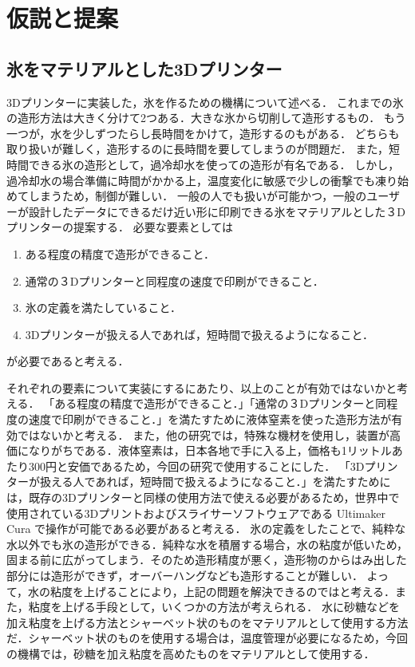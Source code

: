 \chapter{仮説と提案}
\label{chp:first}

\section{氷をマテリアルとした3Dプリンター}
\label{sec:paragraph2}

3Dプリンターに実装した，氷を作るための機構について述べる．
これまでの氷の造形方法は大きく分けて2つある．大きな氷から切削して造形するもの．
もう一つが，水を少しずつたらし長時間をかけて，造形するのもがある．
どちらも取り扱いが難しく，造形するのに長時間を要してしまうのが問題だ．
また，短時間できる氷の造形として，過冷却水を使っての造形が有名である．
しかし，過冷却水の場合準備に時間がかかる上，温度変化に敏感で少しの衝撃でも凍り始めてしまうため，制御が難しい．
一般の人でも扱いが可能かつ，一般のユーザーが設計したデータにできるだけ近い形に印刷できる氷をマテリアルとした３Dプリンターの提案する．
必要な要素としては

\begin{enumerate}
  \item ある程度の精度で造形ができること． 
  \item 通常の３Dプリンターと同程度の速度で印刷ができること．
  \item 氷の定義を満たしていること．
  \item 3Dプリンターが扱える人であれば，短時間で扱えるようになること．
 \end{enumerate}

が必要であると考える．

それぞれの要素について実装にするにあたり、以上のことが有効ではないかと考える．
「ある程度の精度で造形ができること．」「通常の３Dプリンターと同程度の速度で印刷ができること．」を満たすために液体窒素を使った造形方法が有効ではないかと考える．
また，他の研究では，特殊な機材を使用し，装置が高価になりがちである．液体窒素は，日本各地で手に入る上，価格も1リットルあたり300円と安価であるため，今回の研究で使用することにした．
「3Dプリンターが扱える人であれば，短時間で扱えるようになること．」を満たすためには，既存の3Dプリンターと同様の使用方法で使える必要があるため，世界中で使用されている3Dプリントおよびスライサーソフトウェアである Ultimaker Cura で操作が可能である必要があると考える．
氷の定義をしたことで、純粋な水以外でも氷の造形ができる．純粋な水を積層する場合，水の粘度が低いため，固まる前に広がってしまう．そのため造形精度が悪く，造形物のからはみ出した部分には造形ができず，オーバーハングなども造形することが難しい．
よって，水の粘度を上げることにより，上記の問題を解決できるのではと考える．また，粘度を上げる手段として，いくつかの方法が考えられる．
水に砂糖などを加え粘度を上げる方法とシャーベット状のものをマテリアルとして使用する方法だ．シャーベット状のものを使用する場合は，温度管理が必要になるため，今回の機構では，砂糖を加え粘度を高めたものをマテリアルとして使用する．

